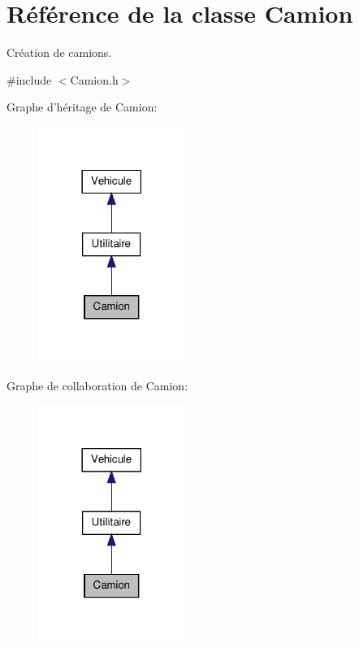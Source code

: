 \hypertarget{class_camion}{
\section{Référence de la classe Camion}
\label{class_camion}
}


Création de camions.  




{\ttfamily \#include $<$Camion.h$>$}



Graphe d'héritage de Camion:\nopagebreak
\begin{figure}[H]
\begin{center}
\leavevmode
\includegraphics[width=134pt]{class_camion__inherit__graph}
\end{center}
\end{figure}


Graphe de collaboration de Camion:\nopagebreak
\begin{figure}[H]
\begin{center}
\leavevmode
\includegraphics[width=134pt]{class_camion__coll__graph}
\end{center}
\end{figure}
